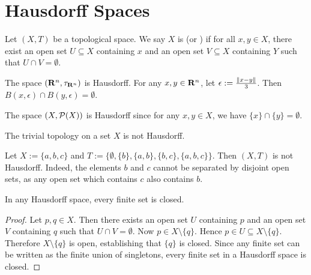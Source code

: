 \section{Hausdorff Spaces}

\begin{definition}
    Let $(X,T)$ be a topological space. We say $X$ is  (or ) if for all $x,y \in X$, there exist an open set $U \subseteq X$ containing $x$ and an open set $V \subseteq X$ containing $Y$ such that $U \cap V = \emptyset$.
\end{definition}

\begin{example}
    The space $(\mathbf{R}^n, \tau_{\mathbf{R}^n})$ is Hausdorff. For any $x,y \in \mathbf{R}^n$, let $\epsilon := \frac{\left\lVert x-y \right\rVert}{3}$. Then $B(x,\epsilon) \cap B(y,\epsilon) = \emptyset$.
\end{example}

\begin{example}
    The space $(X,\mathcal{P}(X))$ is Hausdorff since for any $x,y \in X$, we have $\{x\} \cap \{y\} = \emptyset$.
\end{example}

\begin{example}
    The trivial topology on a set $X$ is not Hausdorff.
\end{example}

\begin{example}
    Let $X := \{a,b,c\}$ and $T:= \{\emptyset, \{b\}, \{a,b\}, \{b,c\}, \{a,b,c\}\}$. Then $(X,T)$ is not Hausdorff. Indeed, the elements $b$ and $c$ cannot be separated by disjoint open sets, as any open set which contains $c$ also contains $b$.
\end{example}

\begin{proposition}
    In any Hausdorff space, every finite set is closed.
\end{proposition}
    \begin{proof}
        Let $p,q \in X$. Then there exists an open set $U$ containing $p$ and an open set $V$ containing $q$ such that $U \cap V = \emptyset$. Now $p \in X \setminus \{q\}$. Hence $p \in U \subseteq X \setminus \{q\}$. Therefore $X \setminus\{q\}$ is open, establishing that $\{q\}$ is closed. Since any finite set can be written as the finite union of singletons, every finite set in a Hausdorff space is closed.
    \end{proof}

